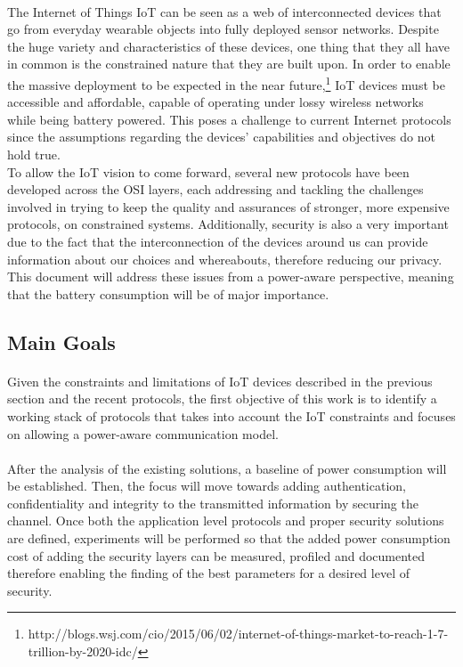 \paragraph{}The Internet of Things \ac{IoT} can be seen as a web of interconnected devices that go from everyday wearable objects into fully deployed sensor networks. Despite the huge variety and characteristics of these devices, one thing that they all have in common is the constrained nature that they are built upon. In order to enable the massive deployment to be expected in the near future,\footnote{http://blogs.wsj.com/cio/2015/06/02/internet-of-things-market-to-reach-1-7-trillion-by-2020-idc/} \ac{IoT} devices must be accessible and affordable, capable of operating under lossy wireless networks while being battery powered. This poses a challenge to current Internet protocols since the assumptions regarding the devices' capabilities and objectives do not hold true.\\ To allow the \ac{IoT} vision to come forward, several new protocols have been developed across the OSI layers, each addressing and tackling the challenges involved in trying to keep the quality and assurances of stronger, more expensive protocols, on constrained systems.
Additionally, security is also a very important due to the fact that the interconnection of the devices around us can provide information about our choices and whereabouts, therefore reducing our privacy.
This document will address these issues from a power-aware perspective, meaning that the battery consumption will be of major importance.

\subsection{Main Goals}

\paragraph{}
Given the constraints and limitations of \ac{IoT} devices described in the previous section and the recent protocols, the first objective of this work is to identify a working stack of protocols that takes into account the \ac{IoT} constraints and focuses on allowing a power-aware communication model.

\paragraph{}
After the analysis of the existing solutions, a baseline of power consumption will be established. Then, the focus will move towards adding authentication, confidentiality and integrity to the transmitted information by securing the channel.
Once both the application level protocols and proper security solutions are defined, experiments will be performed so that the added power consumption cost of adding the security layers can be measured, profiled and documented therefore enabling the finding of the best parameters for a desired level of security.

